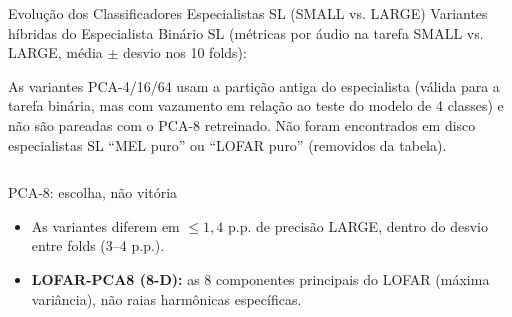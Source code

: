 \documentclass[aspectratio=169]{beamer}
\begin{document}
\begin{frame}{Evolu\c{c}\~{a}o dos Classificadores Especialistas SL (SMALL vs. LARGE)}
    \small
    Variantes h\'{i}bridas do Especialista Bin\'{a}rio SL (m\'{e}tricas por \'{a}udio na tarefa SMALL vs. LARGE, m\'{e}dia $\pm$ desvio nos 10 folds):
    
    \vspace{0.1cm}
    \begin{table}[h]
    \centering
    \end{table}
    \vspace{-0.2cm}
    {\tiny As variantes PCA-4/16/64 usam a parti\c{c}\~{a}o antiga do especialista (v\'{a}lida para a tarefa bin\'{a}ria, mas com vazamento em rela\c{c}\~{a}o ao teste do modelo de 4 classes) e n\~{a}o s\~{a}o pareadas com o PCA-8 retreinado. N\~{a}o foram encontrados em disco especialistas SL ``MEL puro'' ou ``LOFAR puro'' (removidos da tabela).\par}
    
    \vspace{0.1cm}
    \begin{columns}[t]
        \begin{block}{\small PCA-8: escolha, n\~{a}o vit\'{o}ria}
            \scriptsize
            \begin{itemize}
                \setlength{\itemsep}{1pt}
                \item As variantes diferem em $\le 1,4$ p.p. de precis\~{a}o LARGE, dentro do desvio entre folds ($3$--$4$ p.p.).
                \item \textbf{LOFAR-PCA8 (8-D):} as 8 componentes principais do LOFAR (m\'{a}xima vari\^{a}ncia), n\~{a}o raias harm\^{o}nicas espec\'{i}ficas.
            \end{itemize}
        \end{block}
        

\end{columns}
\end{frame}
\end{document}
